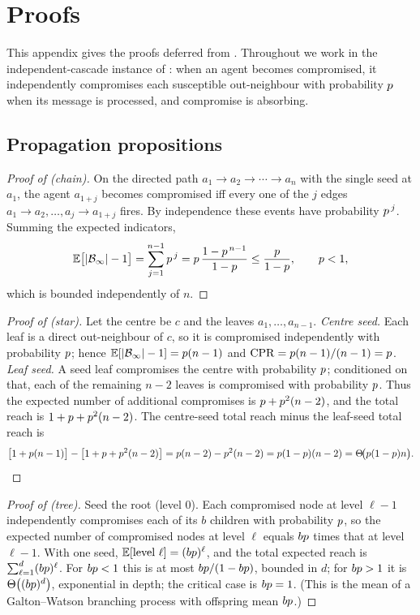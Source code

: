 \section{Proofs}
\label{app:proofs}

This appendix gives the proofs deferred from . Throughout we work in the
independent-cascade instance of : when an agent becomes compromised, it
independently compromises each susceptible out-neighbour with probability $p$ when its
message is processed, and compromise is absorbing.

\subsection{Propagation propositions}

\begin{proof}[Proof of  (chain)]
On the directed path $a_1\to a_2\to\cdots\to a_n$ with the single seed at $a_1$, the agent
$a_{1+j}$ becomes compromised iff every one of the $j$ edges $a_1\to a_2,\dots,a_j\to a_{1+j}$
fires. By independence these events have probability $p^{\,j}$. Summing the expected
indicators,
\[
\mathbb{E}\bigl[|\mathcal{B}_\infty|-1\bigr]=\sum_{j=1}^{n-1}p^{\,j}
=p\,\frac{1-p^{\,n-1}}{1-p}\le \frac{p}{1-p},
\qquad p<1,
\]
which is bounded independently of $n$.
\end{proof}

\begin{proof}[Proof of  (star)]
Let the centre be $c$ and the leaves $a_1,\dots,a_{n-1}$.
\emph{Centre seed.} Each leaf is a direct out-neighbour of $c$, so it is compromised
independently with probability $p$; hence $\mathbb{E}[|\mathcal{B}_\infty|-1]=p(n-1)$ and
$\mathrm{CPR}=p(n-1)/(n-1)=p$.
\emph{Leaf seed.} A seed leaf compromises the centre with probability $p$; conditioned on
that, each of the remaining $n-2$ leaves is compromised with probability $p$. Thus the
expected number of additional compromises is $p+p^{2}(n-2)$, and the total reach is
$1+p+p^{2}(n-2)$. The centre-seed total reach minus the leaf-seed total reach is
\[
\bigl[1+p(n-1)\bigr]-\bigl[1+p+p^{2}(n-2)\bigr]
=p(n-2)-p^{2}(n-2)=p(1-p)(n-2)=\Theta\!\bigl(p(1-p)n\bigr).
\qedhere
\]
\end{proof}

\begin{proof}[Proof of  (tree)]
Seed the root (level $0$). Each compromised node at level $\ell-1$ independently compromises
each of its $b$ children with probability $p$, so the expected number of compromised
nodes at level $\ell$ equals $bp$ times that at level $\ell-1$. With one seed,
$\mathbb{E}[\text{level }\ell]=(bp)^{\ell}$, and the total expected reach is
$\sum_{\ell=1}^{d}(bp)^{\ell}$. For $bp<1$ this is at most $bp/(1-bp)$,
bounded in $d$; for $bp>1$ it is $\Theta\bigl((bp)^{d}\bigr)$, exponential in depth;
the critical case is $bp=1$. (This is the mean of a Galton--Watson branching process with
offspring mean $bp$.)
\end{proof}

